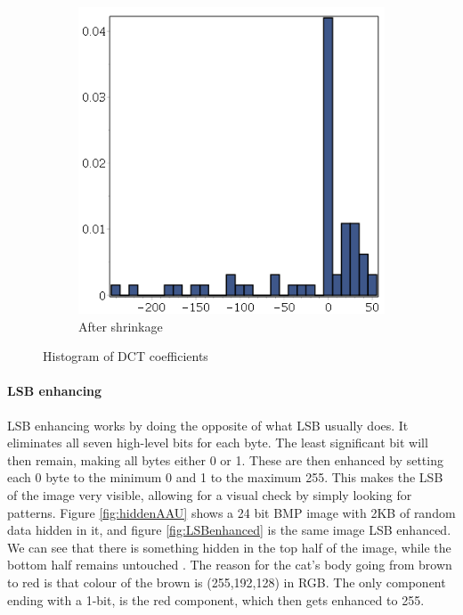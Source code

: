 \begin{figure}
\begin{subfigure}[b]{0.45\textwidth}
		\includegraphics[width=\textwidth]{figures/outputF5.png}
		\caption{After shrinkage}
		\label{fig:outputF5}
    \end{subfigure}
    \caption{Histogram of DCT coefficients}
\end{figure}

\paragraph*{LSB enhancing}
LSB enhancing works by doing the opposite of what LSB usually does.
It eliminates all seven high-level bits for each byte. 
The least significant bit will then remain, making all bytes either 0 or 1.
These are then enhanced by setting each 0 byte to the minimum 0 and 1 to the maximum 255.
This makes the LSB of the image very visible, allowing for a visual check by simply looking for patterns.
Figure \ref{fig:hiddenAAU} shows a 24 bit BMP image with 2KB of random data hidden in it, and figure \ref{fig:LSBenhanced} is the same image LSB enhanced.
We can see that there is something hidden in the top half of the image, while the bottom half remains untouched \citep{Westfeld2000}. The reason for the cat's body going from brown to red is that colour of the brown is (255,192,128) in RGB. The only component ending with a 1-bit, is the red component, which then gets enhanced to 255.

